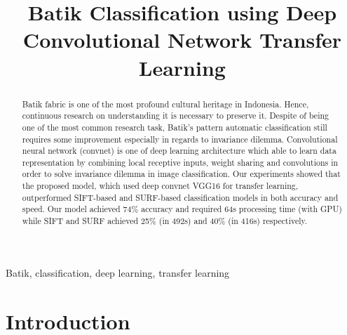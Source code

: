 \documentclass[conference]{IEEEtran}
\begin{document}
%
\title{Batik Classification using Deep Convolutional Network Transfer Learning}


\author{

\and
{}

}

\maketitle


\begin{abstract}
Batik fabric is one of the most profound cultural heritage in Indonesia. Hence, continuous research on understanding it is necessary to preserve it. Despite of being one of the most common research task, Batik's pattern automatic classification still requires some improvement especially in regards to invariance dilemma. Convolutional neural network (convnet) is one of deep learning architecture which able to learn data representation by combining local receptive inputs, weight sharing and convolutions in order to solve invariance dilemma in image classification. Our experiments showed that the proposed model, which used deep convnet VGG16 for transfer learning, outperformed SIFT-based and SURF-based classification models in both accuracy and speed. Our model achieved 74\% accuracy and required 64s processing time (with GPU) while SIFT and SURF achieved 25\% (in 492s) and 40\% (in 416s) respectively. 
\end{abstract}

\begin{IEEEkeywords}
Batik, classification, deep learning, transfer learning
\end{IEEEkeywords}

\section{Introduction}
\end{document}
